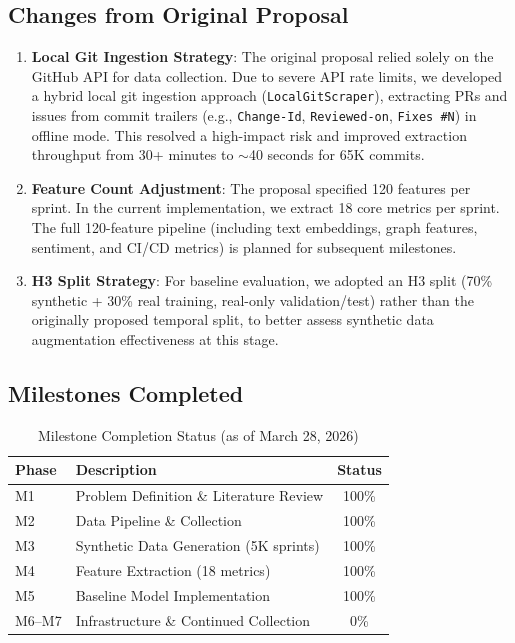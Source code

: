 \documentclass[journal]{IEEEtran}
\begin{document}
\subsection{Changes from Original Proposal}

\begin{enumerate}
    \item \textbf{Local Git Ingestion Strategy}: The original proposal relied solely on the GitHub API for data collection. Due to severe API rate limits, we developed a hybrid local git ingestion approach (\texttt{LocalGitScraper}), extracting PRs and issues from commit trailers (e.g., \texttt{Change-Id}, \texttt{Reviewed-on}, \texttt{Fixes \#N}) in offline mode. This resolved a high-impact risk and improved extraction throughput from 30+ minutes to $\sim$40 seconds for 65K commits.
    \item \textbf{Feature Count Adjustment}: The proposal specified 120 features per sprint. In the current implementation, we extract 18 core metrics per sprint. The full 120-feature pipeline (including text embeddings, graph features, sentiment, and CI/CD metrics) is planned for subsequent milestones.
    \item \textbf{H3 Split Strategy}: For baseline evaluation, we adopted an H3 split (70\% synthetic + 30\% real training, real-only validation/test) rather than the originally proposed temporal split, to better assess synthetic data augmentation effectiveness at this stage.
\end{enumerate}

\subsection{Milestones Completed}

\begin{table}[htbp]
\centering
\caption{Milestone Completion Status (as of March 28, 2026)}
\label{tab:milestones}
\begin{tabular}{l|l|c}
\toprule
\textbf{Phase} & \textbf{Description} & \textbf{Status} \\
\midrule
M1 & Problem Definition \& Literature Review & 100\% \\
M2 & Data Pipeline \& Collection & 100\% \\
M3 & Synthetic Data Generation (5K sprints) & 100\% \\
M4 & Feature Extraction (18 metrics) & 100\% \\
M5 & Baseline Model Implementation & 100\% \\
\midrule
M6--M7 & Infrastructure \& Continued Collection & 0\% \\
\bottomrule
\end{tabular}
\end{table}
\end{document}
